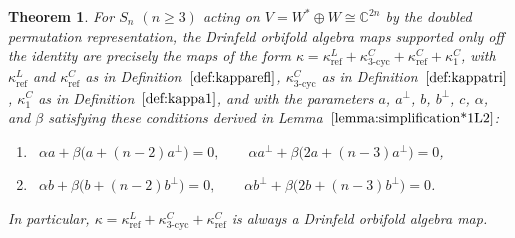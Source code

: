 \documentclass[10pt,a4paper]{amsart}
\numberwithin{equation}{section}
\newtheorem{Theorem}{Theorem}[section]
\DeclareMathOperator{\refl}{ref}
\DeclareMathOperator{\tri}{3-cyc}
\begin{document}
\begin{Theorem}\label{thm:DOAMapsDoubledPerm}
For $S_n$ $(n \geq 3)$ acting on $V=W^* \oplus W \cong \mathbb{C}^{2n}$ by the
doubled permutation representation, the Drinfeld orbifold algebra maps
supported only off the identity are precisely the maps of the form
$\kappa=\kappa^L_{\refl}+\kappa^C_{\tri}+\kappa^C_{\refl}+\kappa^C_1$, with
$\kappa^L_{\refl}$ and $\kappa^C_{\refl}$ as in Definition~$\ref{def:kapparefl}$,
$\kappa^C_{\tri}$ as in Definition~$\ref{def:kappatri}$, $\kappa^C_1$
as in Definition~$\ref{def:kappa1}$, and with the parameters
$a$, $a^\perp$, $b$, $b^\perp$, $c$, $\alpha$, and $\beta$ satisfying
these conditions derived in Lemma~$\ref{lemma:simplification*1L2}$:
\begin{enumerate}	\itemsep=0pt
	\item[\eqref{Obstr2PhiC1C2C3L2=0a}] \ $\alpha a + \beta\big(a+(n-2)a^\perp\big)=0, \qquad \alpha a^\perp + \beta\big(2a+(n-3)a^\perp\big)=0$,
	\item[\eqref{Obstr2PhiC1C2C3L2=0b}] \ $\alpha b + \beta\big(b+(n-2)b^\perp\big)=0, \qquad \alpha b^\perp + \beta\big(2b+(n-3)b^\perp\big)=0$.
\end{enumerate}
In particular, $\kappa=\kappa^L_{\refl}+\kappa^C_{\tri}+\kappa^C_{\refl}$ is
always a Drinfeld orbifold algebra map.
\end{Theorem}
\end{document}
